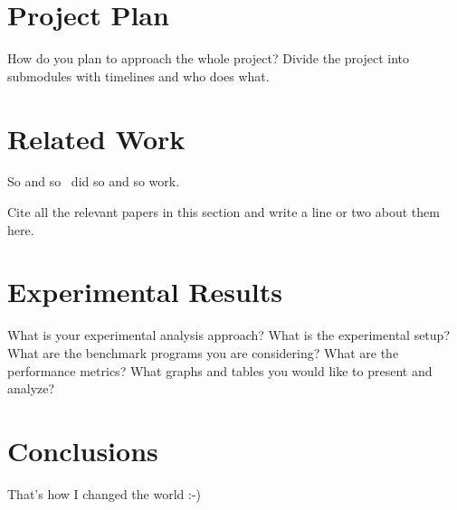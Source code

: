 \documentclass[conference]{IEEEtran}
\begin{document}
\section{Project Plan}
How do you plan to approach the whole project? Divide the project into 
submodules with timelines and who does what. 

\section{Related Work}
So and so~\cite{trimberger15threeages} did so and so work.

Cite all the relevant papers in this section and write a line or two about them
here.
\section{Experimental Results}
What is your experimental analysis approach? What is the experimental setup?
What are the benchmark programs you are considering? What are the performance
metrics? What graphs and tables you would like to present and analyze?

\section{Conclusions}
That's how I changed the world :-)



\end{document}
